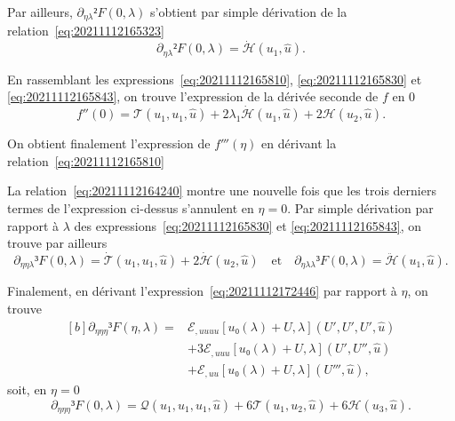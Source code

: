 \documentclass[12pt, final]{amsart}
\begin{document}
Par ailleurs, \(\partial_{η\lambda}²F(0, \lambda)\) s'obtient par simple
dérivation de la relation~\eqref{eq:20211112165323}
\begin{equation}
  \label{eq:20211112165843}
  \partial_{η\lambda}²F(0, \lambda)=\dot{\mathcal H}(u_1, \hat{u}).
\end{equation}

En rassemblant les expressions~\eqref{eq:20211112165810},
\eqref{eq:20211112165830} et \eqref{eq:20211112165843}, on trouve l'expression
de la dérivée seconde de \(f\) en 0
\begin{equation}
  \label{eq:20211112182333}
  f''(0)=\mathcal T(u_1, u_1, \hat{u})
  +2\lambda_1\dot{\mathcal H}(u_1, \hat{u})
  +2\mathcal H(u_2, \hat{u}).
\end{equation}

On obtient finalement l'expression de \(f'''(η)\) en dérivant la
relation~\eqref{eq:20211112165810}

La relation~\eqref{eq:20211112164240} montre une nouvelle fois que les trois
derniers termes de l'expression ci-dessus s'annulent en \(η=0\). Par simple
dérivation par rapport à \(\lambda\) des expressions~\eqref{eq:20211112165830}
et \eqref{eq:20211112165843}, on trouve par ailleurs
\begin{equation}
  \label{eq:20211112173247}
  \partial_{ηη\lambda}³F(0, \lambda)
  =\dot{\mathcal T}(u_1, u_1, \hat{u})+2\dot{\mathcal H}(u_2, \hat{u})
  \quad\text{et}\quad
  \partial_{η\lambda\lambda}³F(0, \lambda)
  =\ddot{\mathcal H}(u_1, \hat{u}).
\end{equation}

Finalement, en dérivant l'expression~\eqref{eq:20211112172446} par rapport à
\(η\), on trouve
\begin{equation}
  \begin{aligned}[b]
    \partial_{ηηη}³F(η, \lambda)={}&
    ℰ_{,uuuu}[u₀(\lambda)+U, \lambda](U', U', U', \hat{u})\\
    &+3ℰ_{,uuu}[u₀(\lambda)+U, \lambda](U', U'', \hat{u})\\
    &+ℰ_{,uu}[u₀(\lambda)+U, \lambda](U''', \hat{u}),
  \end{aligned}
\end{equation}
soit, en \(η=0\)
\begin{equation}
  \label{eq:20211112173300}
  \partial_{ηηη}³F(0, \lambda)=
  \mathcal Q(u_1, u_1, u_1, \hat{u})
  +6\mathcal T(u_1, u_2, \hat{u})
  +6\mathcal H(u_3, \hat{u}).
\end{equation}
\end{document}
